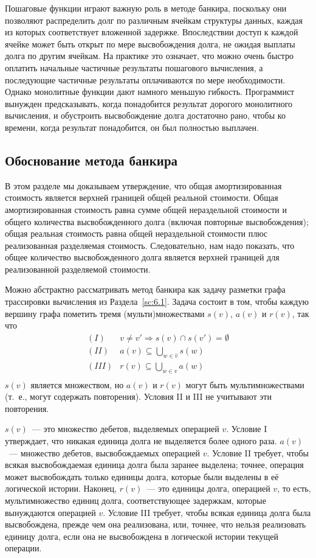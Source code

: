 Пошаговые функции играют важную роль в методе банкира, поскольку они
позволяют распределить долг по различным ячейкам структуры данных,
каждая из которых соответствует вложенной задержке.  Впоследствии
доступ к каждой ячейке может быть открыт по мере высвобождения долга,
не ожидая выплаты долга по другим ячейкам.  На практике это означает,
что можно очень быстро оплатить начальные частичные результаты
пошагового вычисления, а последующие частичные результаты оплачиваются
по мере необходимости.  Однако монолитные функции дают намного меньшую
гибкость.  Программист вынужден предсказывать, когда понадобится
результат дорогого монолитного вычисления, и обустроить высвобождение
долга достаточно рано, чтобы ко времени, когда результат понадобится,
он был полностью выплачен.

\subsection{Обоснование метода банкира}
\label{sc:6.3.1}

В этом разделе мы доказываем утверждение, что общая амортизированная
стоимость является верхней границей общей реальной стоимости. Общая
амортизированная стоимость равна сумме общей нераздельной стоимости и
общего количества высвобожденного долга (включая повторные
высвобождения); общая реальная стоимость равна общей нераздельной
стоимости плюс реализованная разделяемая стоимость. Следовательно, нам
надо показать, что общее количество высвобожденного долга является
верхней границей для реализованной разделяемой стоимости.

Можно абстрактно рассматривать метод банкира как задачу разметки графа
трассировки вычисления из Раздела~\ref{sc:6.1}. Задача состоит в том,
чтобы каждую вершину графа пометить тремя (мульти)множествами $s(v)$,
$a(v)$ и $r(v)$, так что
$$
\begin{array}{cl}
  (I) & v \ne v' \Rightarrow s(v) \cap s(v') = \emptyset \\
  (II) & a(v) \subseteq \bigcup_{w \in \hat{v}} s(w) \\
  (III) & r(v) \subseteq \bigcup_{w \in \hat{v}} a(w) \\
\end{array}
$$
$s(v)$ является множеством, но $a(v)$ и $r(v)$ могут быть
мультимножествами (т.~е., могут содержать повторения). Условия II и
III не учитывают эти повторения.

$s(v)$~--- это множество дебетов, выделяемых операцией $v$. Условие I
утверждает, что никакая единица долга не выделяется более одного
раза. $a(v)$~--- множество дебетов, высвобождаемых операцией
$v$. Условие II требует, чтобы всякая высвобождаемая единица долга
была заранее выделена; точнее, операция может высвобождать только
единицы долга, которые были выделены в её логической
истории. Наконец, $r(v)$~--- это единицы долга,
 операцией $v$, то есть, мультимножество
единиц долга, соответствующее задержкам, которые вынуждаются операцией
$v$. Условие III требует, чтобы всякая единица долга была
высвобождена, прежде чем она реализована, или, точнее, что нельзя
реализовать единицу долга, если она не высвобождена в логической
истории текущей операции.

